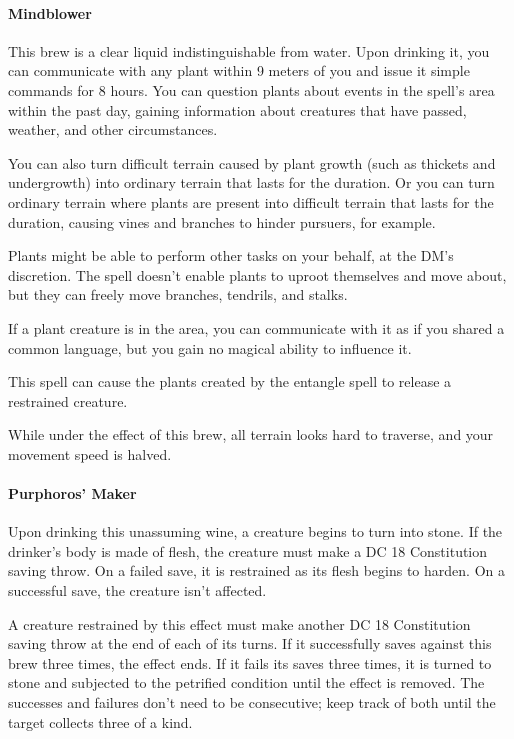 \paragraph{Mindblower} %
    This brew is a clear liquid indistinguishable from water.
    Upon drinking it, you can communicate with any plant within 9 meters of you and issue it simple commands for 8 hours.
    You can question plants about events in the spell's area within the past day, gaining information about creatures that have passed, weather, and other circumstances.

    You can also turn difficult terrain caused by plant growth (such as thickets and undergrowth) into ordinary terrain that lasts for the duration.
    Or you can turn ordinary terrain where plants are present into difficult terrain that lasts for the duration, causing vines and branches to hinder pursuers, for example.

    Plants might be able to perform other tasks on your behalf, at the DM's discretion. The spell doesn't enable plants to uproot themselves and move about, but they can freely move branches, tendrils, and stalks.

    If a plant creature is in the area, you can communicate with it as if you shared a common language, but you gain no magical ability to influence it.

    This spell can cause the plants created by the entangle spell to release a restrained creature.

    While under the effect of this brew, all terrain looks hard to traverse, and your movement speed is halved.
\paragraph{Purphoros' Maker} %
    Upon drinking this unassuming wine, a creature begins to turn into stone.
    If the drinker's body is made of flesh, the creature must make a DC 18 Constitution saving throw.
    On a failed save, it is restrained as its flesh begins to harden.
    On a successful save, the creature isn't affected.

    A creature restrained by this effect must make another DC 18 Constitution saving throw at the end of each of its turns.
    If it successfully saves against this brew three times, the effect ends.
    If it fails its saves three times, it is turned to stone and subjected to the petrified condition until the effect is removed.
    The successes and failures don't need to be consecutive; keep track of both until the target collects three of a kind.

